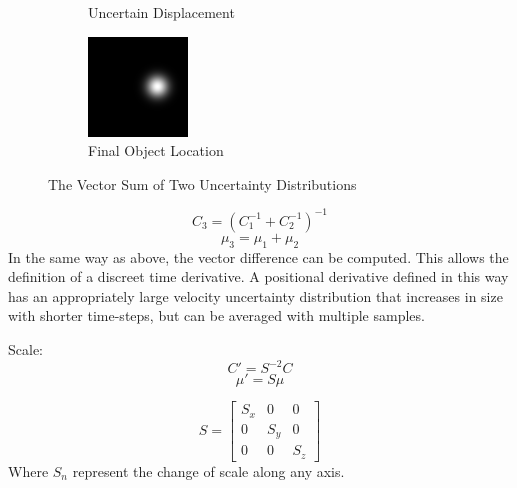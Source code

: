 \documentclass[a4paper, 11pt, titlepage]{article}
\begin{document}
\begin{figure}
\begin{subfigure}{.3\textwidth}
        \caption{Uncertain Displacement}
        \label{fig:vectSumsub2}
      \end{subfigure}
      \begin{subfigure}{.3\textwidth}
        \centering
        \includegraphics[width=.8\linewidth]{images/GaussianSum3.png}
        \caption{Final Object Location}
        \label{fig:vectSumsub3}
      \end{subfigure}
      \caption{The Vector Sum of Two Uncertainty Distributions}
      \label{fig:vectSum}
      \end{figure}
      \begin{equation}
      C_3 = (C_1^{-1} + C_2^{-1})^{-1}
      \end{equation}
      \begin{equation}
      \mu_3 = \mu_1 + \mu_2
      \end{equation}
      In the same way as above, the vector difference can be computed.  This allows the definition of a discreet time derivative.  A positional derivative defined in this way has an appropriately large velocity uncertainty distribution that increases in size with shorter time-steps, but can be averaged with multiple samples.

      Scale:
      \begin{equation}
      C' = S^{-2} C
      \end{equation}
      \begin{equation}
      \mu' = S \mu
      \end{equation}

      \begin{equation}
      S=\begin{bmatrix}
        S_x & 0 & 0 \\[0.3em]
        0 & S_y & 0 \\[0.3em]
        0 & 0 & S_z
      \end{bmatrix}
      \end{equation}
      Where \(S_n\) represent the change of scale along any axis.
\end{document}
